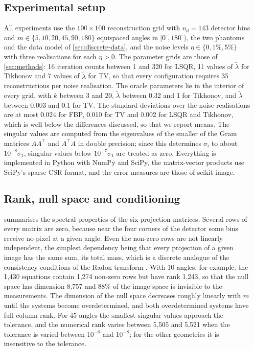 \documentclass[11pt,a4paper]{article}
\numberwithin{equation}{section}
\theoremstyle{remark}
\newcommand{\T}{\top}
\begin{document}
\subsection{Experimental setup}\label{sec:results-setup}

All experiments use the $100\times100$ reconstruction grid with $n_d=143$ detector bins and $m\in\{5,10,20,45,90,180\}$ equispaced angles in $[0^\circ,180^\circ)$, the two phantoms and the data model of \cref{sec:discrete-data}, and the noise levels $\eta\in\{0,1\%,5\%\}$ with three realisations for each $\eta>0$. The parameter grids are those of \cref{sec:methods}: 16 iteration counts between 1 and 320 for LSQR, 11 values of $\tilde\lambda$ for Tikhonov and 7 values of $\tilde\lambda$ for TV, so that every configuration requires 35 reconstructions per noise realisation. The oracle parameters lie in the interior of every grid, with $k$ between 3 and 20, $\tilde\lambda$ between 0.32 and 1 for Tikhonov, and $\tilde\lambda$ between 0.003 and 0.1 for TV. The standard deviations over the noise realisations are at most 0.024 for FBP, 0.010 for TV and 0.002 for LSQR and Tikhonov, which is well below the differences discussed, so that we report means. The singular values are computed from the eigenvalues of the smaller of the Gram matrices $AA^\T$ and $A^\T A$ in double precision; since this determines $\sigma_i$ to about $10^{-8}\sigma_1$, singular values below $10^{-7}\sigma_1$ are treated as zero. Everything is implemented in Python with NumPy and SciPy, the matrix-vector products use SciPy's sparse CSR format, and the error measures are those of scikit-image.

\subsection{Rank, null space and conditioning}\label{sec:results-spectrum}

 summarises the spectral properties of the six projection matrices. Several rows of every matrix are zero, because near the four corners of the detector some bins receive no pixel at a given angle. Even the non-zero rows are not linearly independent, the simplest dependency being that every projection of a given image has the same sum, its total mass, which is a discrete analogue of the consistency conditions of the Radon transform \citep{natterer2001}. With 10 angles, for example, the 1{,}430 equations contain 1{,}274 non-zero rows but have rank 1{,}243, so that the null space has dimension 8{,}757 and 88\% of the image space is invisible to the measurements. The dimension of the null space decreases roughly linearly with $m$ until the systems become overdetermined, and both overdetermined systems have full column rank. For 45 angles the smallest singular values approach the tolerance, and the numerical rank varies between 5{,}505 and 5{,}521 when the tolerance is varied between $10^{-6}$ and $10^{-8}$; for the other geometries it is insensitive to the tolerance.
\end{document}
